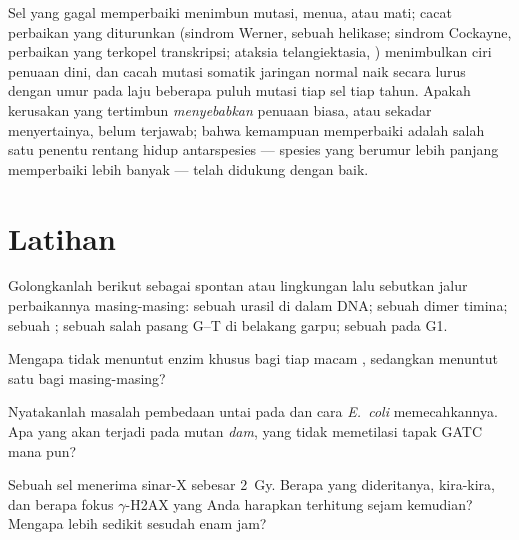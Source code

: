 \begin{remark}\label{rem:b3:dna-repair:ageing}
Sel yang gagal memperbaiki menimbun mutasi, menua, atau mati; cacat perbaikan
yang diturunkan (sindrom Werner, sebuah helikase; sindrom Cockayne, perbaikan
yang terkopel transkripsi; ataksia telangiektasia, ) menimbulkan ciri
penuaan dini, dan cacah mutasi somatik jaringan normal naik secara lurus
dengan umur pada laju beberapa puluh mutasi tiap sel tiap tahun. Apakah
kerusakan yang tertimbun \emph{menyebabkan} penuaan biasa, atau sekadar
menyertainya, belum terjawab; bahwa kemampuan memperbaiki adalah salah satu
penentu rentang hidup antarspesies --- spesies yang berumur lebih panjang
memperbaiki lebih banyak --- telah didukung dengan baik.
\end{remark}

\section{Latihan}

\begin{exercise}[$\star$]\label{exo:b3:dna-repair:1}
Golongkanlah  berikut sebagai spontan atau lingkungan lalu sebutkan
jalur perbaikannya masing-masing: sebuah urasil di dalam DNA; sebuah dimer
timina; sebuah ; sebuah salah pasang G--T di belakang garpu;
sebuah  pada G1.
\end{exercise}

\begin{exercise}[$\star$]\label{exo:b3:dna-repair:2}
Mengapa  tidak menuntut enzim khusus bagi tiap
macam , sedangkan  menuntut satu  bagi
masing-masing?
\end{exercise}

\begin{exercise}[$\star$]\label{exo:b3:dna-repair:3}
Nyatakanlah masalah pembedaan untai pada  dan cara
\emph{E.~coli} memecahkannya. Apa yang akan terjadi pada mutan \emph{dam},
yang tidak memetilasi tapak GATC mana pun?
\end{exercise}

\begin{exercise}[$\star$]\label{exo:b3:dna-repair:4}
Sebuah sel menerima sinar-X sebesar \qty{2}{Gy}. Berapa 
yang dideritanya, kira-kira, dan berapa fokus $\gamma$-H2AX yang Anda
harapkan terhitung sejam kemudian? Mengapa lebih sedikit sesudah enam jam?
\end{exercise}

